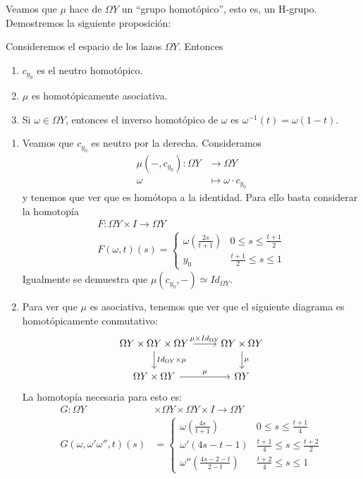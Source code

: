 Veamos que $\mu$ hace de $\Omega Y$ un ``grupo homotópico'', esto es, un H-grupo. Demostremos la siguiente proposición:
\begin{prop}
Consideremos el espacio de los lazos $\Omega Y$. Entonces
\begin{enumerate}
\item $c_{y_0}$ es el neutro homotópico.
\item $\mu$ es homotópicamente asociativa.
\item Si $\omega \in \Omega Y$, entonces el inverso homotópico de $\omega$ es $\omega^{-1}(t) = \omega(1 - t)$.
\end{enumerate}
\end{prop}
\begin{demo}
\begin{enumerate}
\item Veamos que $c_{y_0}$ es neutro por la derecha. Consideramos
\begin{align*}
\mu(-,c_{y_0}) : \Omega Y &\longrightarrow \Omega Y \\
\omega &\longmapsto \omega \cdotp c_{y_0}
\end{align*}
y tenemos que ver que es homótopa a la identidad. Para ello basta considerar la homotopía
\begin{align*}
F: \Omega Y \times I \longrightarrow \Omega Y \\
F(\omega, t)(s) = 
\begin{cases}
\omega\left(\frac{2s}{t+1}\right) & 0 \leq s \leq \frac{t+1}{2} \\
y_0													& \frac{t+1}{2} \leq s \leq 1
\end{cases}
\end{align*}
Igualmente se demuestra que $\mu(c_{y_0}, -) \simeq Id_{\Omega Y}$.
\item Para ver que $\mu$ es asociativa, tenemos que ver que el siguiente diagrama es homotópicamente conmutativo: 
\[
\begin{tikzcd}
	\Omega Y \times \Omega Y \times \Omega Y \rar{\mu \times Id_{\Omega Y}} \dar{Id_{\Omega Y} \times \mu}
		  & \Omega Y \times \Omega Y \dar{\mu} \\
	\Omega Y \times \Omega Y \rar{\mu} 
		  & \Omega Y
\end{tikzcd}
\]
La homotopía necesaria para esto es:
\begin{align*}
G: 	\Omega Y &\times \Omega Y \times \Omega Y \times I \longrightarrow \Omega Y \\
G(\omega, \omega' \omega'', t)(s) &= 
\begin{cases}
\omega \left( \frac{4s}{t+1}\right) & 0 \leq s \leq \frac{t+1}{4} \\
\omega'(4s - t - 1)         		 & \frac{t+1}{4} \leq s \leq \frac{t+2}{2} \\
\omega''\left( \frac{4s -2 - t}{2-t}\right) & \frac{t+2}{4} \leq s \leq 1
\end{cases}
\end{align*}


\end{enumerate}
\end{demo}
